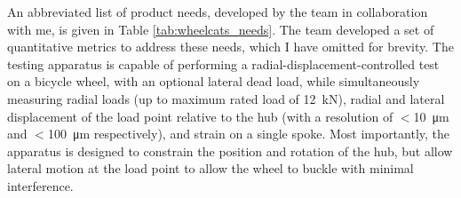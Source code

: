\documentclass[\rootdir/thesis.tex]{subfiles}
\begin{document}
An abbreviated list of product needs, developed by the team in collaboration with me, is given in Table \ref{tab:wheelcats_needs}. The team developed a set of quantitative metrics to address these needs, which I have omitted for brevity. The testing apparatus is capable of performing a radial-displacement-controlled test on a bicycle wheel, with an optional lateral dead load, while simultaneously measuring radial loads (up to maximum rated load of \SI{12}{\kilo\newton}), radial and lateral displacement of the load point relative to the hub (with a resolution of $<$\SI{10}{\micro\meter} and $<$\SI{100}{\micro\meter} respectively), and strain on a single spoke. Most importantly, the apparatus is designed to constrain the position and rotation of the hub, but allow lateral motion at the load point to allow the wheel to buckle with minimal interference.
\end{document}
